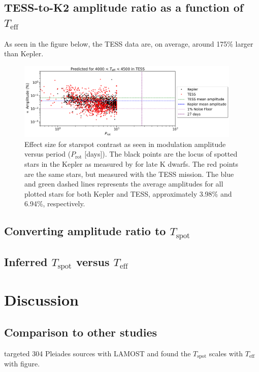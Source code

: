 \documentclass[twocolumn]{aastex631}
\begin{document}
\subsection{TESS-to-K2 amplitude ratio as a function of $T_{\mathrm{eff}}$}

As seen in the figure below, the TESS data are, on average, around 175\% larger than Kepler.

\begin{figure}[!htb]
  \centering
  \includegraphics[width=0.95\textwidth]{Amplitude vs. Rotation for Kepler and TESS.png}
  \caption{Effect size for starspot contrast as seen in modulation amplitude versus period ($P_{\mathrm{rot}}$ [days]). The black points are the locus of spotted stars in the Kepler as measured by for late K dwarfs. The red points are the same stars, but measured with the TESS mission. The blue and green dashed lines represents the average amplitudes for all plotted stars for both Kepler and TESS, approximately 3.98\% and 6.94\%, respectively.}
\end{figure}
\FloatBarrier

\subsection{Converting amplitude ratio to $T_{\mathrm{spot}}$}

\subsection{Inferred $T_{\mathrm{spot}}$ versus $T_{\mathrm{eff}}$}


\section{Discussion}

\subsection{Comparison to other studies}
\citet{2016MNRAS.463.2494F} targeted 304 Pleiades sources with LAMOST and found the $T_{\mathrm{spot}}$ scales with $T_{\mathrm{eff}}$ with figure.
\end{document}
